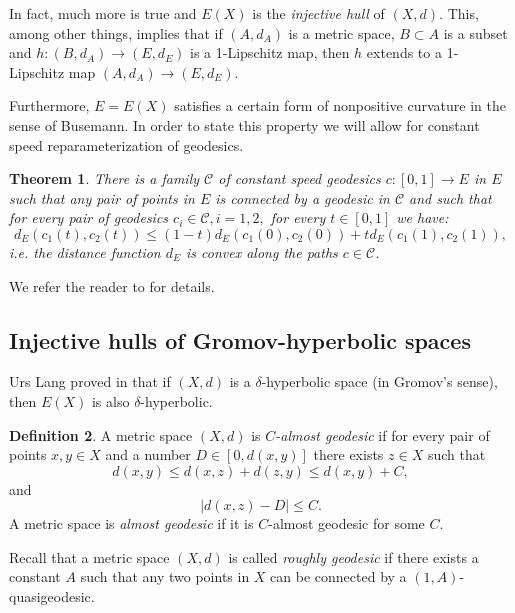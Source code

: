 \documentclass[12pt]{amsbook}%
\newtheorem{thm}{Theorem}[chapter]
\theoremstyle{definition}
\newtheorem{defi}[thm]{Definition}
\theoremstyle{remark}
\numberwithin{section}{chapter}
\numberwithin{subsection}{section}
\numberwithin{figure}{chapter}
\def\cC{{\mathscr{C}}}
\begin{document}
In fact, much more is true and $E(X)$ is the {\em injective hull} of $(X,d)$.  This, among other things, implies that if $(A,d_A)$ is a metric space, $B\subset A$ is a subset 
and $h: (B,d_A)\to (E, d_E)$ is a 1-Lipschitz map, then $h$ extends to a 1-Lipschitz map $(A,d_A)\to (E,d_E)$. 

Furthermore, $E=E(X)$ satisfies a certain form of nonpositive curvature in the sense of Busemann. In order to state this property we will allow for constant speed reparameterization of geodesics.  


\begin{thm}\label{thm:comb}
There is a family $\cC$ of constant speed geodesics $c: [0,1]\to E$ 
in $E$ such that any pair of points in $E$ is connected by a geodesic in $\cC$ and such that for every pair of geodesics $c_i\in \cC, i=1,2,$ for every $t\in [0,1]$ we have:
\begin{equation}\label{eq:B-convex}
d_E(c_1(t), c_2(t))\leqslant (1-t)d_E(c_1(0), c_2(0)) + t d_E(c_1(1), c_2(1)),\end{equation}
i.e. the distance function $d_E$ is convex along the paths $c\in \cC$. 
\end{thm}

\medskip 
 We refer the reader to \cite{Lang} for details. 


\subsection{Injective hulls of Gromov-hyperbolic spaces}\label{sec:hyp-injective hull}

Urs Lang proved in \cite[Proposition 1.3]{Lang} that if  $(X,d)$ is a $\delta$-hyperbolic space (in Gromov's sense), then $E(X)$ is also  $\delta$-hyperbolic. 

\begin{defi}\label{def:almost geodesic metric space} 
A metric space $(X,d)$ is {\em $C$-almost geodesic} if for every pair of points $x, y\in X$ and a number $D\in [0, d(x,y)]$ there exists $z\in X$ such that
$$
d(x,y)\leqslant d(x,z)+ d(z, y) \leqslant d(x,y) +C,
$$
and
$$
|d(x, z)- D|\leqslant C. 
$$
A metric space is {\em almost geodesic} if it is $C$-almost geodesic for some $C$. 
\end{defi}

Recall that a metric space $(X,d)$ is called {\em roughly geodesic} if there exists a constant $A$ such that any two points in $X$ can be 
connected by a $(1,A)$-quasigeodesic. 
\end{document}
